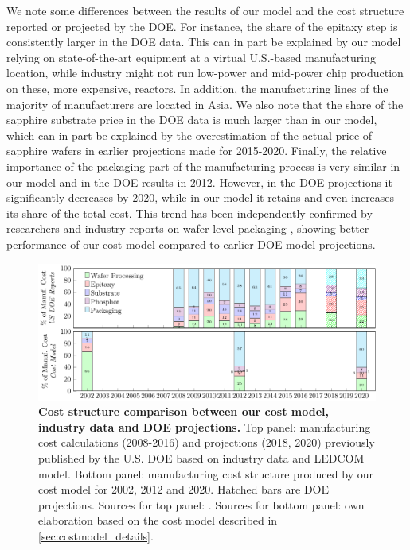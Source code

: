 \documentclass[parskip=full]{article}
\begin{document}
We note some differences between the results of our model and the cost structure reported or projected by the DOE. For instance, the share of the epitaxy step is consistently larger in the DOE data. This can in part be explained by our model relying on state-of-the-art equipment at a virtual U.S.-based manufacturing location, while industry might not run low-power and mid-power chip production on these, more expensive, reactors. In addition, the manufacturing lines of the majority of manufacturers are located in Asia. We also note that the share of the sapphire substrate price in the DOE data is much larger than in our model, which can in part be explained by the overestimation of the actual price of sapphire wafers in earlier projections made for 2015-2020. Finally, the relative importance of the packaging part of the manufacturing process is very similar in our model and in the DOE results in 2012. However, in the DOE projections it significantly decreases by 2020, while in our model it retains and even increases its share of the total cost. This trend has been independently confirmed by researchers and industry reports on wafer-level packaging \cite{Lee2011WPL,Xie2013,ledsmag2017WLP}, showing better performance of our cost model compared to earlier DOE model projections.

\begin{figure}[h]
	\centering
    \includegraphics[width=\textwidth]{./figures/costmodel_calibration.pdf}
	\caption{\textbf{Cost structure comparison between our cost model, industry data and DOE projections.} Top panel: manufacturing cost calculations (2008-2016) and projections (2018, 2020) previously published by the U.S. DOE based on industry data and LEDCOM model. Bottom panel: manufacturing cost structure produced by our cost model for 2002, 2012 and 2020. Hatched bars are DOE projections. Sources for top panel: \cite{doe2010solid}\cite{doe2011solid}\cite{doe2012solid}\cite{doe2013solid}\cite{doe2014solid}\cite{doe2015solid}\cite{doe2016solid}. Sources for bottom panel: own elaboration based on the cost model described in \cref{sec:costmodel_details}.}
	\label{fig:costmodel_calibration}
\end{figure}
\end{document}
